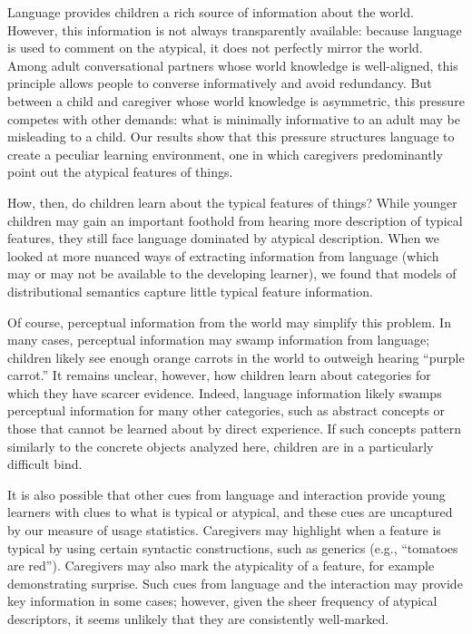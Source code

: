 \documentclass{ucetd}
\begin{document}
Language provides children a rich source of information about the world.
However, this information is not always transparently available: because
language is used to comment on the atypical, it does not perfectly
mirror the world. Among adult conversational partners whose world
knowledge is well-aligned, this principle allows people to converse
informatively and avoid redundancy. But between a child and caregiver
whose world knowledge is asymmetric, this pressure competes with other
demands: what is minimally informative to an adult may be misleading to
a child. Our results show that this pressure structures language to
create a peculiar learning environment, one in which caregivers
predominantly point out the atypical features of things.

How, then, do children learn about the typical features of things? While
younger children may gain an important foothold from hearing more
description of typical features, they still face language dominated by
atypical description. When we looked at more nuanced ways of extracting
information from language (which may or may not be available to the
developing learner), we found that models of distributional semantics
capture little typical feature information.

Of course, perceptual information from the world may simplify this
problem. In many cases, perceptual information may swamp information
from language; children likely see enough orange carrots in the world to
outweigh hearing ``purple carrot.'' It remains unclear, however, how
children learn about categories for which they have scarcer evidence.
Indeed, language information likely swamps perceptual information for
many other categories, such as abstract concepts or those that cannot be
learned about by direct experience. If such concepts pattern similarly
to the concrete objects analyzed here, children are in a particularly
difficult bind.

It is also possible that other cues from language and interaction
provide young learners with clues to what is typical or atypical, and
these cues are uncaptured by our measure of usage statistics. Caregivers
may highlight when a feature is typical by using certain syntactic
constructions, such as generics (e.g., ``tomatoes are red''). Caregivers
may also mark the atypicality of a feature, for example demonstrating
surprise. Such cues from language and the interaction may provide key
information in some cases; however, given the sheer frequency of
atypical descriptors, it seems unlikely that they are consistently
well-marked.
\end{document}
